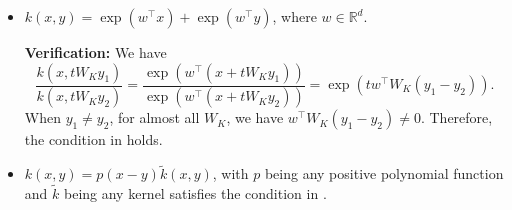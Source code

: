 \documentclass{article}
\begin{document}
\begin{itemize}
    \textbf{Verification:}
    We have
    \begin{equation}
        \label{eq:kernel_phi}
        \begin{aligned}
            \frac{k(x,tW_Ky_1)}{k(x,tW_Ky_2)}&=\frac{\phi(x)^{\top}\phi(tW_Ky_1)}{\phi(x)^{\top}\phi(tW_Ky_2)}\\
            &=\exp\left(\frac{t^2}{2}(\|W_Ky_2\|_2^2-\|W_Ky_1\|_2^2)\right)\frac{\sum_{i=1}^m \exp(\omega_i^\top x) \exp( t \omega_i^\top W_ky_1)}{\sum_{i=1}^m \exp(\omega_i^\top x)\exp(t \omega_i^\top W_ky_2)}
        \end{aligned}
    \end{equation}
    We claim that if $w_i$ are pair-wise linear independent, i.e. there does not exist $i\neq j$ such that $w_i=\alpha w_j$ for some $\alpha\in\mathbb R$, the condition in  holds. This almost surely holds when $w_i$ are drawn i.i.d. from a Gaussian distribution.

    If when $t\to\infty$, the ratio in~\eqref{eq:kernel_phi} do not goes to infinity or zero, it must hold that
    \begin{equation}
        \label{eq:kernel_phi2}
        \|W_Ky_1\|_2=\|W_Ky_2\|_2, \text{ and }         \max_{i}\{\omega_i^\top W_Ky_1\}=\max_{i}\{\omega_i^\top W_Ky_2\}.
    \end{equation}
    When $w_i$ are pair-wise linear independent, we have that $y_1w_i^\top\neq y_2w_j^\top$ for all $i\neq j\in [m]$. Also, since $y_1\neq y_2$ and $w_i$ are non-zero(by the pair-wise independent condition), we have $y_1w_i^\top\neq y_2w_i^\top$ for all $i\in [m]$. Therefore, we have that all the sets
    \begin{equation}
        \{W_K\mid \omega_i^\top W_Ky_1=\omega_j^\top W_Ky_1\}=\{W_K\mid \langle W_K, y_1 w_i^\top-y_2w_j^\top\rangle_F=0\},
    \end{equation}
    where $\langle\cdot, \cdot\rangle_F$ denotes the Frobenius inner product, are hyperplanes in $\mathbb R^{d\times d}$, which has zero measure. That is, equation~~\eqref{eq:kernel_phi2} only holds for a measure-zero set of $W_K$, which completes the verification.
    \item $k(x,y)=\exp(w^\top x)+\exp(w^\top y)$, where $w\in\mathbb R^d$.
 
    \textbf{Verification:}
    We have
    \begin{equation}
        \frac{k(x,tW_Ky_1)}{k(x,tW_Ky_2)}=\frac{\exp(w^\top (x+ tW_Ky_1))}{\exp(w^\top (x+tW_Ky_2))}=\exp(tw^\top W_K(y_1-y_2)).
    \end{equation}
    When $y_1\neq y_2$, for almost all $W_K$, we have $w^\top W_K(y_1-y_2)\neq 0$. Therefore, the condition in  holds.
    \item $k(x,y)=p(x-y)\tilde k(x,y)$, with $p$ being any positive polynomial function and $\tilde k$ being any kernel satisfies the condition in . 
    

\end{itemize}
\end{document}
